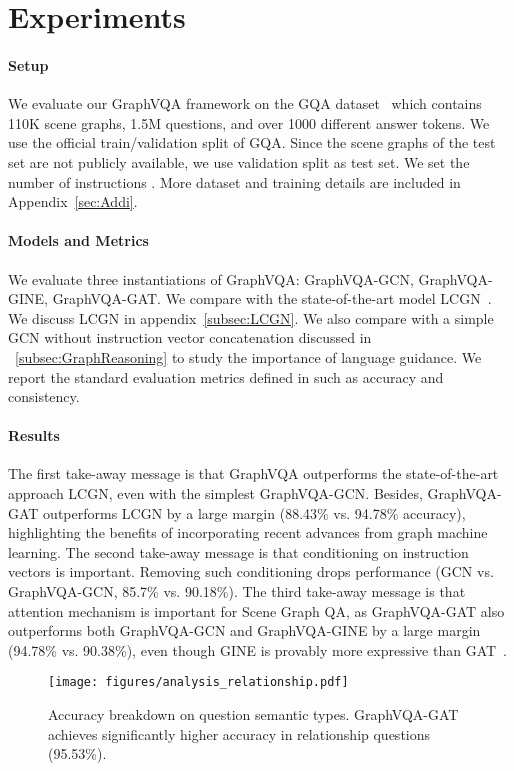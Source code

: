 \documentclass[11pt]{article}
\begin{document}
\section{Experiments}
\label{sec:experiments}
\paragraph{Setup}
We evaluate our GraphVQA framework on the GQA  dataset~\cite{GQA} which contains 110K scene graphs, 1.5M questions, and over 1000 different answer tokens. 
We use the official train/validation split of GQA. Since the scene graphs of the test set are not publicly available, we use validation split as test set. 
We set the number of instructions . 
More dataset and training details are included in Appendix~\ref{sec:Addi}. 


\paragraph{Models and Metrics}
We evaluate three instantiations of GraphVQA: GraphVQA-GCN, GraphVQA-GINE, GraphVQA-GAT. We compare with the state-of-the-art model LCGN~\cite{LCGN}. We discuss LCGN in appendix~\ref{subsec:LCGN}. 
We also compare with a simple GCN without instruction vector concatenation discussed in ~\ref{subsec:GraphReasoning} to study the importance of language guidance. 
We report the standard evaluation metrics defined in \citet{GQA} such as accuracy and consistency. 


\paragraph{Results} The first take-away message is that GraphVQA outperforms the state-of-the-art approach LCGN, even with the simplest GraphVQA-GCN. Besides, GraphVQA-GAT outperforms LCGN by a large margin (88.43\% vs. 94.78\% accuracy), highlighting the benefits of incorporating recent advances from graph machine learning. 
The second take-away message is that conditioning on instruction vectors is important. Removing such conditioning drops performance (GCN vs. GraphVQA-GCN, 85.7\% vs. 90.18\%). The third take-away message is that attention mechanism is important for Scene Graph QA, as GraphVQA-GAT also outperforms both GraphVQA-GCN and GraphVQA-GINE by a large margin (94.78\% vs. 90.38\%), 
even though GINE is provably more expressive than GAT~\cite{GIN}. 

\begin{figure}[t]
    \centering
    \texttt{[image: figures/analysis\_relationship.pdf]}
    \caption{
    Accuracy breakdown on question semantic types. 
    GraphVQA-GAT achieves significantly higher accuracy in relationship questions (95.53\%).
}
    \label{fig:accurayTypes}
\end{figure}
\end{document}
